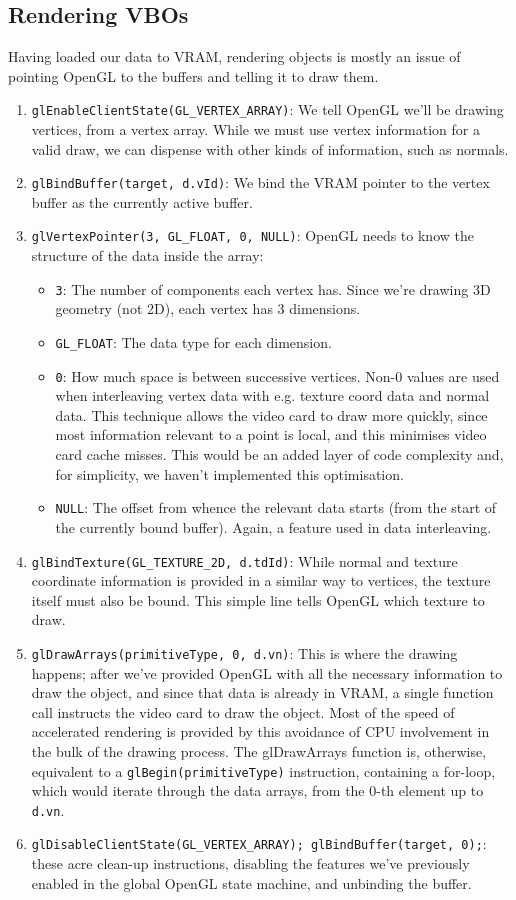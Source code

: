 \documentclass{scrartcl}
\begin{document}
\subsection{Rendering VBOs}
Having loaded our data to VRAM, rendering objects is mostly an issue of pointing OpenGL to the buffers and telling it to draw them.

\begin{enumerate}
\item \lstinline{glEnableClientState(GL_VERTEX_ARRAY)}: We tell OpenGL we'll be drawing vertices, from a vertex array. While we must use vertex information for a valid draw, we can dispense with other kinds of information, such as normals.
\item \lstinline{glBindBuffer(target, d.vId)}: We bind the VRAM pointer to the vertex buffer as the currently active buffer.
\item \lstinline{glVertexPointer(3, GL_FLOAT, 0, NULL)}: OpenGL needs to know the structure of the data inside the array:
  \begin{itemize}
  \item \lstinline{3}: The number of components each vertex has. Since we're drawing 3D geometry (not 2D), each vertex has 3 dimensions.
  \item \lstinline{GL_FLOAT}: The data type for each dimension.
  \item \lstinline{0}: How much space is between successive vertices. Non-$0$ values are used when interleaving vertex data with e.g. texture coord data and normal data. This technique allows the video card to draw more quickly, since most information relevant to a point is local, and this minimises video card cache misses. This would be an added layer of code complexity and, for simplicity, we haven't implemented this optimisation.
  \item \lstinline{NULL}: The offset from whence the relevant data starts (from the start of the currently bound buffer). Again, a feature used in data interleaving. 
  \end{itemize}
\item \lstinline{glBindTexture(GL_TEXTURE_2D, d.tdId)}: While normal and texture coordinate information is provided in a similar way to vertices, the texture itself must also be bound. This simple line tells OpenGL which texture to draw.
\item \lstinline{glDrawArrays(primitiveType, 0, d.vn)}: This is where the drawing happens; after we've provided OpenGL with all the necessary information to draw the object, and since that data is already in VRAM, a single function call instructs the video card to draw the object. Most of the speed of accelerated rendering is provided by this avoidance of CPU involvement in the bulk of the drawing process. The glDrawArrays function is, otherwise, equivalent to a \lstinline{glBegin(primitiveType)} instruction, containing a for-loop, which would iterate through the data arrays, from the $0$-th element up to \lstinline{d.vn}.
\item \lstinline{glDisableClientState(GL_VERTEX_ARRAY); glBindBuffer(target, 0);}: these acre clean-up instructions, disabling the features we've previously enabled in the global OpenGL state machine, and unbinding the buffer.
  

\end{enumerate}
\end{document}
